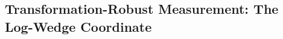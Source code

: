 \documentclass[11pt,a4paper]{article}
\theoremstyle{plain}
\theoremstyle{definition}
\begin{document}








\subsection{Transformation-Robust Measurement: The Log-Wedge Coordinate}
\label{sec:coord}
\end{document}
